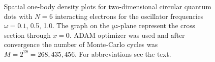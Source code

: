 \begin{landscape}
\begin{figure} [H]
		\caption{Spatial one-body density plots for two-dimensional circular quantum dots with $N=6$ interacting electrons for the oscillator frequencies $\omega=0.1$, 0.5, 1.0. The graph on the $yz$-plane represent the cross section through $x=0$. ADAM optimizer was used and after convergence the number of Monte-Carlo cycles was $M=2^{28}=268,435,456$. For abbreviations see the text.}%
		\label{fig:OB2_interaction_6P}
	\end{figure}
	\begin{figure} [H]%
		\centering
		\captionsetup[subfigure]{labelformat=empty}
		\captionsetup{width=0.9\hsize}
		\hspace{0.1cm}
		\hspace{-0.0cm}
		\hspace{-0.0cm}
		\hspace{-0.0cm}
		\\ [-0.3cm]
		

\end{figure}
\end{landscape}
